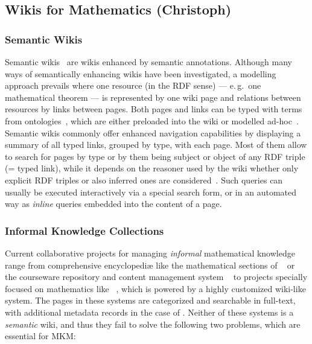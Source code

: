 \documentclass{llncs}
\begin{document}
\subsection{Wikis for Mathematics (Christoph)}
\label{sec:math-wiki}

\subsubsection{Semantic Wikis}
\label{sec:semwiki}

Semantic wikis~\cite{semwiki06} are wikis enhanced by semantic annotations.  Although many
ways of semantically enhancing wikis have been investigated, a modelling approach prevails
where one resource (in the RDF sense) --- e.\,g.\ one mathematical theorem
--- is represented by one wiki page and relations between resources by links between
pages.  Both pages and links can be typed with terms from
ontologies~\cite{OrDeMoVoHa06:annotation-navigation-semwiki}, which are either preloaded
into the wiki or modelled ad-hoc~\cite{KrSchVr:semwiki-reasoning07}.  Semantic wikis
commonly offer enhanced navigation capabilities by displaying a summary of all typed
links, grouped by type, with each page.  Most of them allow to search for pages by type or
by them being subject or object of any RDF triple (= typed link), while it depends on the
reasoner used by the wiki whether only explicit RDF triples or also inferred ones are
considered~\cite{KrSchVr:semwiki-reasoning07}.  Such queries can usually be executed
interactively via a special search form, or in an automated way as \emph{inline} queries
embedded into the content of a page.

\subsubsection{Informal Knowledge Collections}
\label{sec:math-knowledge-collections}

Current collaborative projects for managing \emph{informal} mathematical knowledge range
from comprehensive encyclopediæ like the mathematical sections of
~\cite{wikipedia} or the courseware repository and content management
system ~\cite{CNX:whitepaper} to projects specially focused on
mathematics like ~\cite{krowne03:collaborative-math-libraries}, which
is powered by a highly customized wiki-like system.  The pages in these systems are
categorized and searchable in full-text, with additional metadata records in the case of
.  Neither of these systems is a \emph{semantic} wiki, and thus they
fail to solve the following two problems, which are essential for MKM:
\end{document}
